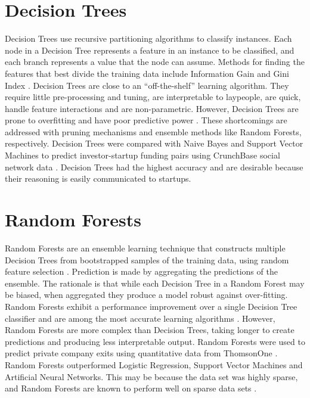 \section{Decision Trees}

Decision Trees use recursive partitioning algorithms to classify instances. Each node in a Decision Tree represents a feature in an instance to be classified, and each branch represents a value that the node can assume. Methods for finding the features that best divide the training data include Information Gain and Gini Index \cite{kotsiantis2007}. Decision Trees are close to an ``off-the-shelf'' learning algorithm. They require little pre-processing and tuning, are interpretable to laypeople, are quick, handle feature interactions and are non-parametric. However, Decision Trees are prone to overfitting and have poor predictive power \cite{caruana2006}. These shortcomings are addressed with pruning mechanisms and ensemble methods like Random Forests, respectively. Decision Trees were compared with Naive Bayes and Support Vector Machines to predict investor-startup funding pairs using CrunchBase social network data \cite{liang2016}. Decision Trees had the highest accuracy and are desirable because their reasoning is easily communicated to startups.

\section{Random Forests}

Random Forests are an ensemble learning technique that constructs multiple Decision Trees from bootstrapped samples of the training data, using random feature selection \cite{breiman2001}. Prediction is made by aggregating the predictions of the ensemble. The rationale is that while each Decision Tree in a Random Forest may be biased, when aggregated they produce a model robust against over-fitting.  Random Forests exhibit a performance improvement over a single Decision Tree classifier and are among the most accurate learning algorithms \cite{caruana2006}.  However, Random Forests are more complex than Decision Trees, taking longer to create predictions and producing less interpretable output. Random Forests were used to predict private company exits using quantitative data from ThomsonOne \cite{bhat2011}. Random Forests outperformed Logistic Regression, Support Vector Machines and Artificial Neural Networks. This may be because the data set was highly sparse, and Random Forests are known to perform well on sparse data sets \cite{breiman2001}.

